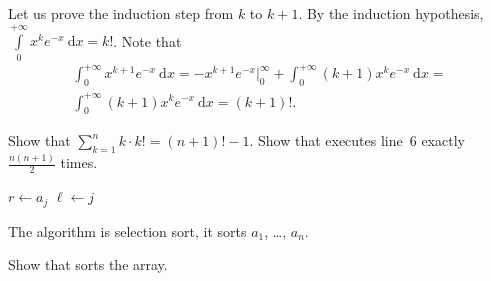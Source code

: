 \begin{chapterendexercises}
\begin{solution}
      Let us prove the induction step from $k$ to $k + 1$. By the induction
      hypothesis, $\int\limits_0^{+\infty} x^k e^{- x} ~ \mathrm{d}x = k!$.
      Note that
      \begin{multline*}
        \int_0^{+\infty} x^{k + 1} e^{- x} ~ \mathrm{d}x = 
        -x^{k + 1} e^{- x}\big\rvert_0^\infty +
          \int_0^{+\infty} (k + 1) x^k e^{- x} ~ \mathrm{d}x = \\
        \int_0^{+\infty} (k + 1) x^k e^{- x} ~ \mathrm{d}x = (k + 1)!.
      \end{multline*}
    \end{solution}
  \exercise Show that $\sum_{k = 1}^n k \cdot k! = (n + 1)! - 1$.
  \exercise Show that  executes line~6 exactly
    $\frac{n (n + 1)}{2}$ times.
    \begin{algorithm}
      \begin{algorithmic}[1]
                \State $r \gets a_j$
                \State $\ell \gets j$
              \EndIf
            \EndFor
          \EndFor
        \EndFunction
      \end{algorithmic}
      \caption{The algorithm is selection sort, it sorts $a_1$, \dots, $a_n$.}
      \label{algorithm:selection-sort}
    \end{algorithm}
  \exercise Show that  sorts the array.
\end{chapterendexercises}

